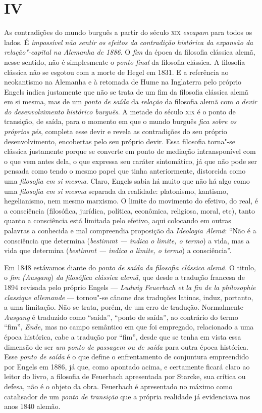 \section*{IV}

As contradições do mundo burguês a partir do século \textsc{xix} \emph{escapam}
para todos os lados. É \emph{impossível não sentir os efeitos da
contradição histórica da expansão da relação"-capital na Alemanha de
1886}. O \emph{fim} da época da filosofia clássica alemã, nesse sentido,
não é simplesmente o \emph{ponto final} da filosofia clássica. A
filosofia clássica não se esgotou com a morte de Hegel em 1831. E a
referência ao neokantismo na Alemanha e à retomada de Hume na Inglaterra
pelo próprio Engels indica justamente que não se trata de um fim da
filosofia clássica alemã em si mesma, mas de um \emph{ponto de saída} da
\emph{relação} da filosofia alemã com \emph{o devir do desenvolvimento
histórico burguês}. A metade do século \textsc{xix} é o ponto de transição, de
saída, para o momento em que o mundo burguês \emph{fica sobre os
próprios} \emph{pés}, completa esse devir e revela as contradições do
seu próprio desenvolvimento, encobertas pelo seu próprio devir. Essa
filosofia torna"-se clássica justamente porque se converte em ponto de
mediação intransponível com o que vem antes dela, o que expressa seu
caráter sintomático, já que não pode ser pensada como tendo o mesmo
papel que tinha anteriormente, distorcida como uma \emph{filosofia em si
mesma}. Claro, Engels sabia há muito que não há algo como uma
\emph{filosofia em si mesma} separada da realidade: platonismo,
kantismo, hegelianismo, nem mesmo marxismo. O limite do movimento do
efetivo, do real, é a consciência (filosófica, jurídica, política,
econômica, religiosa, moral, etc), tanto quanto a consciência está
limitada pelo efetivo, aqui colocando em outras palavras a conhecida e
mal compreendia proposição da \emph{Ideologia Alemã}: ``Não é a
consciência que determina (\emph{bestimmt --- indica o limite, o termo})
a vida, mas a vida que determina (\emph{bestimmt --- indica o limite, o
termo}) a consciência''.

Em 1848 estávamos diante do \emph{ponto de saída da filosofia clássica
alemã}. O titulo, o \emph{fim (Ausgang}) \emph{da filosófica clássica
alemã}, que desde a tradução francesa de 1894 revisada pelo próprio
Engels --- \emph{Ludwig Feuerbach et la fin de la philosophie classique
allemande} --- tornou"-se cânone das traduções latinas, induz, portanto, a
uma limitação. Não se trata, porém, de um erro de tradução. Normalmente
\emph{Ausgang} é traduzido como ``saída'', ``ponto de saída'', ao
contrário do termo ``fim'', \emph{Ende,} mas no campo semântico em que
foi empregado, relacionado a uma época histórica, cabe a tradução por
``fim'', desde que se tenha em vista essa dimensão de ser \emph{um ponto
de passagem ou de saída} para outra época histórica. Esse \emph{ponto de
saída} é o que define o enfrentamento de conjuntura empreendido por
Engels em 1886, já que, como apontado acima, e certamente ficará claro
ao leitor do livro, a filosofia de Feuerbach apresentada por Starcke,
sua crítica ou defesa, não é o objeto da obra. Feuerbach é apresentado
no máximo como catalisador de um \emph{ponto de transição} que a própria
realidade já evidenciava nos anos 1840 alemão.

